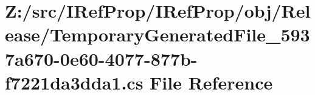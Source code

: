 \hypertarget{_release_2_temporary_generated_file__5937a670-0e60-4077-877b-f7221da3dda1_8cs}{}\section{Z\+:/src/\+I\+Ref\+Prop/\+I\+Ref\+Prop/obj/\+Release/\+Temporary\+Generated\+File\+\_\+5937a670-\/0e60-\/4077-\/877b-\/f7221da3dda1.cs File Reference}
\label{_release_2_temporary_generated_file__5937a670-0e60-4077-877b-f7221da3dda1_8cs}
